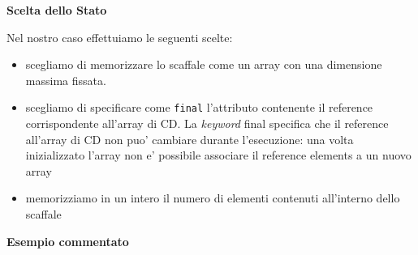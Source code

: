 \documentclass{article}
\begin{document}
\textbf{Scelta dello Stato}

Nel nostro caso effettuiamo le seguenti scelte:
\begin{itemize}
\item scegliamo di memorizzare lo scaffale come un array con una dimensione massima fissata.
\item scegliamo di specificare come \texttt{final} l'attributo contenente il reference corrispondente all'array di CD. La \textit{keyword} final specifica che il reference all'array di CD non puo' cambiare durante l'esecuzione: una volta inizializzato l'array non e' possibile associare il reference elements a un nuovo array 
\item memorizziamo in un intero il numero di elementi contenuti all'interno dello scaffale
\end{itemize}


\textbf{Esempio commentato}
\end{document}

